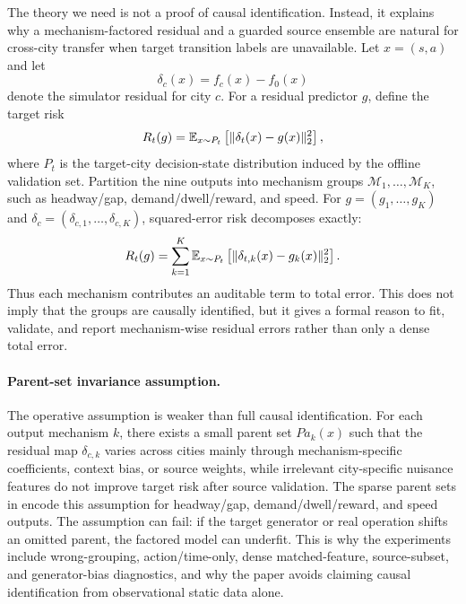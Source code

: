 The theory we need is not a proof of causal identification.
Instead, it explains why a mechanism-factored residual and a guarded source ensemble are natural for cross-city transfer when target transition labels are unavailable.
Let $x=(s,a)$ and let
\[
    \delta_c(x)=f_c(x)-f_0(x)
\]
denote the simulator residual for city $c$.
For a residual predictor $g$, define the target risk
\[
    R_t(g)=\mathbb{E}_{x\sim P_t}\left[\|\delta_t(x)-g(x)\|_2^2\right],
\]
where $P_t$ is the target-city decision-state distribution induced by the offline validation set.
Partition the nine outputs into mechanism groups $\mathcal{M}_1,\ldots,\mathcal{M}_K$, such as headway/gap, demand/dwell/reward, and speed.
For $g=(g_1,\ldots,g_K)$ and $\delta_c=(\delta_{c,1},\ldots,\delta_{c,K})$, squared-error risk decomposes exactly:
\[
    R_t(g)=\sum_{k=1}^{K}
    \mathbb{E}_{x\sim P_t}\left[
        \|\delta_{t,k}(x)-g_k(x)\|_2^2
    \right].
\]
Thus each mechanism contributes an auditable term to total error.
This does not imply that the groups are causally identified, but it gives a formal reason to fit, validate, and report mechanism-wise residual errors rather than only a dense total error.

\paragraph{Parent-set invariance assumption.}
The operative assumption is weaker than full causal identification.
For each output mechanism $k$, there exists a small parent set $Pa_k(x)$ such that the residual map $\delta_{c,k}$ varies across cities mainly through mechanism-specific coefficients, context bias, or source weights, while irrelevant city-specific nuisance features do not improve target risk after source validation.
The sparse parent sets in \ours encode this assumption for headway/gap, demand/dwell/reward, and speed outputs.
The assumption can fail: if the target generator or real operation shifts an omitted parent, the factored model can underfit.
This is why the experiments include wrong-grouping, action/time-only, dense matched-feature, source-subset, and generator-bias diagnostics, and why the paper avoids claiming causal identification from observational static data alone.

